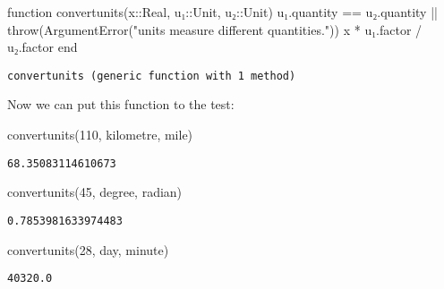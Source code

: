 \documentclass[
  letterpaper,
  DIV=11,
  numbers=noendperiod]{scrreprt}
\newenvironment{Shaded}{\begin{snugshade}}{\end{snugshade}}
\newcommand{\DataTypeTok}[1]{\textcolor[rgb]{0.68,0.00,0.00}{#1}}
\newcommand{\FloatTok}[1]{\textcolor[rgb]{0.68,0.00,0.00}{#1}}
\newcommand{\FunctionTok}[1]{\textcolor[rgb]{0.28,0.35,0.67}{#1}}
\newcommand{\KeywordTok}[1]{\textcolor[rgb]{0.00,0.23,0.31}{#1}}
\newcommand{\NormalTok}[1]{\textcolor[rgb]{0.00,0.23,0.31}{#1}}
\newcommand{\OperatorTok}[1]{\textcolor[rgb]{0.37,0.37,0.37}{#1}}
\newcommand{\StringTok}[1]{\textcolor[rgb]{0.13,0.47,0.30}{#1}}
\begin{document}
\begin{Shaded}
\begin{Highlighting}[]
\KeywordTok{function} \FunctionTok{convertunits}\NormalTok{(x}\OperatorTok{::}\DataTypeTok{Real}\NormalTok{, u₁}\OperatorTok{::}\DataTypeTok{Unit}\NormalTok{, u₂}\OperatorTok{::}\DataTypeTok{Unit}\NormalTok{)}
\NormalTok{    u₁.quantity }\OperatorTok{==}\NormalTok{ u₂.quantity }\OperatorTok{||} \FunctionTok{throw}\NormalTok{(}\FunctionTok{ArgumentError}\NormalTok{(}\StringTok{"units measure different quantities."}\NormalTok{))}
\NormalTok{    x }\OperatorTok{*}\NormalTok{ u₁.factor }\OperatorTok{/}\NormalTok{ u₂.factor}
\KeywordTok{end}
\end{Highlighting}
\end{Shaded}

\begin{verbatim}
convertunits (generic function with 1 method)
\end{verbatim}

Now we can put this function to the test:

\begin{Shaded}
\begin{Highlighting}[]
\FunctionTok{convertunits}\NormalTok{(}\FloatTok{110}\NormalTok{, kilometre, mile)}
\end{Highlighting}
\end{Shaded}

\begin{verbatim}
68.35083114610673
\end{verbatim}

\begin{Shaded}
\begin{Highlighting}[]
\FunctionTok{convertunits}\NormalTok{(}\FloatTok{45}\NormalTok{, degree, radian)}
\end{Highlighting}
\end{Shaded}

\begin{verbatim}
0.7853981633974483
\end{verbatim}

\begin{Shaded}
\begin{Highlighting}[]
\FunctionTok{convertunits}\NormalTok{(}\FloatTok{28}\NormalTok{, day, minute)}
\end{Highlighting}
\end{Shaded}

\begin{verbatim}
40320.0
\end{verbatim}
\end{document}
